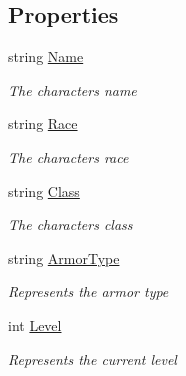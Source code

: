 \subsection*{Properties}
\begin{DoxyCompactItemize}
\item 
string \mbox{\hyperlink{class_dungeons__n___dragons___manager_1_1_models_1_1_character_a334484668875156a6eb1a3cceb600095}{Name}}
\begin{DoxyCompactList}\small\item\em The character\textquotesingle{}s name \end{DoxyCompactList}\item 
string \mbox{\hyperlink{class_dungeons__n___dragons___manager_1_1_models_1_1_character_ab68d8a2655f5207fb85b5f0675a9ea57}{Race}}
\begin{DoxyCompactList}\small\item\em The character\textquotesingle{}s race \end{DoxyCompactList}\item 
string \mbox{\hyperlink{class_dungeons__n___dragons___manager_1_1_models_1_1_character_aed302cc6d5c201e7fa86cad5a0801b9e}{Class}}
\begin{DoxyCompactList}\small\item\em The character\textquotesingle{}s class \end{DoxyCompactList}\item 
string \mbox{\hyperlink{class_dungeons__n___dragons___manager_1_1_models_1_1_character_acece55a0f2da91c0fbbfe14144628b35}{Armor\+Type}}
\begin{DoxyCompactList}\small\item\em Represents the armor type \end{DoxyCompactList}\item 
int \mbox{\hyperlink{class_dungeons__n___dragons___manager_1_1_models_1_1_character_a9ed5ae1ce11d482a9793dc48d1b9b639}{Level}}
\begin{DoxyCompactList}\small\item\em Represents the current level \end{DoxyCompactList}\item 

\end{DoxyCompactItemize}

